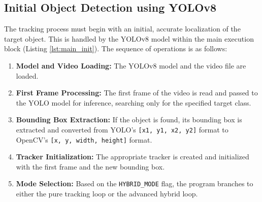 \documentclass[12pt, a4paper]{article}
\begin{document}
\subsection{Initial Object Detection using YOLOv8}
The tracking process must begin with an initial, accurate localization of the target object. This is handled by the YOLOv8 model within the main execution block (Listing \ref{lst:main_init}). The sequence of operations is as follows:
\begin{enumerate}
    \item \textbf{Model and Video Loading:} The YOLOv8 model and the video file are loaded.
    \item \textbf{First Frame Processing:} The first frame of the video is read and passed to the YOLO model for inference, searching only for the specified target class.
    \item \textbf{Bounding Box Extraction:} If the object is found, its bounding box is extracted and converted from YOLO's \texttt{[x1, y1, x2, y2]} format to OpenCV's \texttt{[x, y, width, height]} format.
    \item \textbf{Tracker Initialization:} The appropriate tracker is created and initialized with the first frame and the new bounding box.
    \item \textbf{Mode Selection:} Based on the \texttt{HYBRID\_MODE} flag, the program branches to either the pure tracking loop or the advanced hybrid loop.
\end{enumerate}
\end{document}
